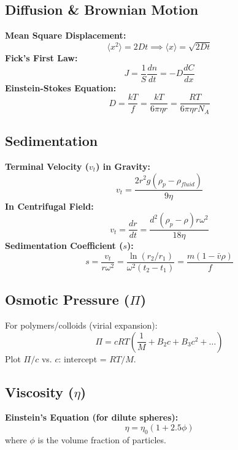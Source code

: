 \subsection{Diffusion \& Brownian Motion}
\textbf{Mean Square Displacement:}
\begin{equation}
    \langle x^2 \rangle = 2Dt \implies \langle x \rangle = \sqrt{2Dt}
\end{equation}
\textbf{Fick's First Law:}
\begin{equation}
    J = \frac{1}{S} \frac{dn}{dt} = -D \frac{dC}{dx}
\end{equation}
\textbf{Einstein-Stokes Equation:}
\begin{equation}
    D = \frac{kT}{f} = \frac{kT}{6 \pi \eta r} = \frac{RT}{6 \pi \eta r N_A}
\end{equation}

\subsection{Sedimentation}
\textbf{Terminal Velocity ($v_t$) in Gravity:}
\begin{equation}
    v_t = \frac{2 r^2 g (\rho_p - \rho_{fluid})}{9 \eta}
\end{equation}
\textbf{In Centrifugal Field:}
\begin{equation}
    v_t = \frac{dr}{dt} = \frac{d^2 (\rho_p - \rho) r \omega^2}{18 \eta}
\end{equation}
\textbf{Sedimentation Coefficient ($s$):}
\begin{equation}
    s = \frac{v_t}{r \omega^2} = \frac{\ln(r_2/r_1)}{\omega^2 (t_2 - t_1)} = \frac{m(1-\bar{v}\rho)}{f}
\end{equation}

\subsection{Osmotic Pressure ($\Pi$)}
For polymers/colloids (virial expansion):
\begin{equation}
    \Pi = c RT \left( \frac{1}{M} + B_2 c + B_3 c^2 + \dots \right)
\end{equation}
Plot $\Pi/c$ vs. $c$: intercept = $RT/M$.

\subsection{Viscosity ($\eta$)}
\textbf{Einstein's Equation (for dilute spheres):}
\begin{equation}
    \eta = \eta_0 (1 + 2.5 \phi)
\end{equation}
where $\phi$ is the volume fraction of particles.
\vspace{0.2cm}